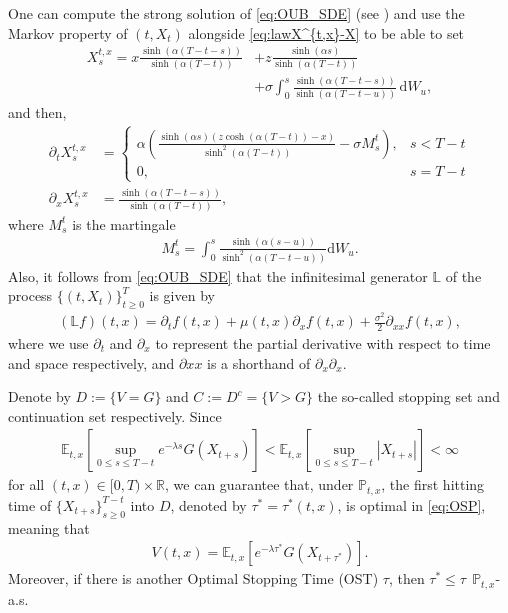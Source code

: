 \documentclass{tufte-handout}
\newcommand{\E}{\mathbb{E}} %
\renewcommand{\Pr}{\mathbb{P}} %
\newcommand{\R}{\mathbb{R}} %
\newcommand{\InfGen}{\mathbb{L}} %
\newcommand{\dif}{\mathrm{d}}
\begin{document}
	One can compute the strong solution of \eqref{eq:OUB_SDE} (see \citet{Barczy2013Sample}) and use the Markov property of $(t, X_t)$ alongside \eqref{eq:lawX^{t,x}-X} to be able to set
	\begin{align}\label{eq:OUB_rep_int}
	X_{s}^{t, x} = x\frac{\sinh(\alpha (T - t - s))}{\sinh(\alpha (T - t))} &+ z\frac{\sinh(\alpha s)}{\sinh(\alpha (T - t))}  \\ 
	&+ \sigma\int_{0}^s \frac{\sinh(\alpha (T - t - s))}{\sinh(\alpha (T - t - u))}\,\mathrm{d}W_u, \nonumber
	\end{align}
	and then,
	\begin{align}
	\partial_t X_s^{t, x} &= \begin{cases}
		\alpha\left(\frac{\sinh(\alpha s)(z\cosh(\alpha(T - t)) - x)}{\sinh^2(\alpha(T - t))} - \sigma M_s^t\right), & s < T - t \\
		0, & s = T - t 
	\end{cases} \label{eq:OUB_t_rep_int} \\
	\partial_x X_s^{t, x} &= \frac{\sinh(\alpha (T - t - s))}{\sinh(\alpha (T - t))}, \label{eq:OUB_x_rep_int}
	\end{align}
	where $M_s^t$ is the martingale
	\begin{align}\label{eq:Ms}
	M_s^{t} = \int_{0}^{s}\frac{\sinh(\alpha (s - u))}{\sinh^2(\alpha(T - t - u))}\dif W_u.
	\end{align}
	Also, it follows from \eqref{eq:OUB_SDE} that the infinitesimal generator $\InfGen$ of the process $\{(t, X_t)\}_{t\geq 0}^T$ is given by
	\begin{align}\label{eq:OUB_InfGen}
	(\InfGen f)(t, x) = \partial_t f(t, x) + \mu(t, x)\partial_x f(t, x) + \frac{\sigma^2}{2} \partial_{xx}f(t, x),
	\end{align}
	where we use $\partial_t$ and $\partial_x$ to represent the partial derivative with respect to time and space respectively, and $\partial{xx}$ is a shorthand of $\partial_x\partial_x$.
	
	Denote by $D := \{V = G\}$ and $C := D^c =\{V > G\}$ the so-called stopping set and continuation set respectively. Since 
	\begin{align}\label{eq:Dominated_convergence_condition}
	\E_{t, x}\left[\sup_{0\leq s\leq T - t} e^{-\lambda s}G(X_{t + s})\right] < \E_{t, x}\left[\sup_{0\leq s\leq T - t} |X_{t + s}|\right] < \infty
	\end{align} 
	for all $(t, x) \in [0, T)\times\R$, we can guarantee that, under $\Pr_{t, x}$, the first hitting time of $\{X_{t + s}\}_{s\geq0}^{T - t}$ into $D$, denoted by $\tau^* = \tau^*(t, x)$, is optimal in \eqref{eq:OSP}, meaning that
	\begin{align}\label{eq:OST}
	V(t, x) = \E_{t, x}\left[e^{-\lambda\tau^*}G(X_{t + \tau^*})\right].
	\end{align}
	Moreover, if there is another Optimal Stopping Time (OST) $\tau$, then $\tau^* \leq \tau\ \ \Pr_{t, x}$-a.s.
	
\end{document}
